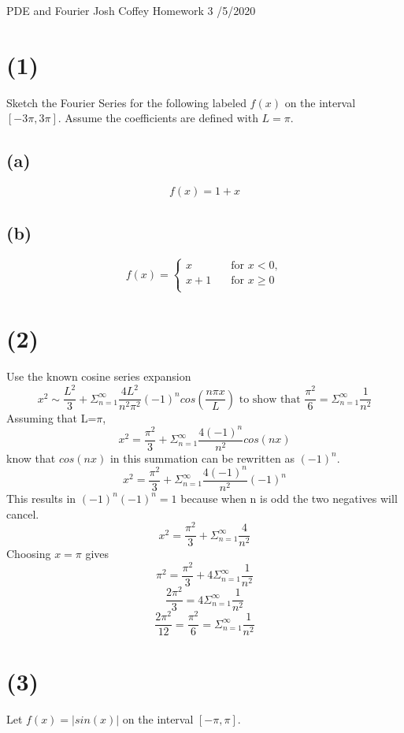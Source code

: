 \documentclass[preview,12pt]{article}
\begin{document}
\noindent PDE and Fourier\newline
Josh Coffey \newline
Homework 3 /5/2020 \newline

\section*{(1)}
    Sketch the Fourier Series for the following labeled $f(x)$ on the interval $[-3\pi,3\pi]$.  Assume the coefficients are defined with $L=\pi$.
    \subsection*{(a)}
        $$f(x)=1+x$$
    \vspace{2in}
    \subsection*{(b)}
        \[   
        f(x) = 
        \begin{cases}
         x &\quad\text{for } x<0, \\
         x+1 &\quad\text{for } x\geq0 \\
        \end{cases}
        \]
    \vspace{2in}
\section*{(2)}
    Use the known cosine series expansion
    $$x^2\sim\frac{L^2}{3}+\Sigma_{n=1}^\infty \frac{4L^2}{n^2\pi^2}(-1)^ncos(\frac{n\pi x}{L}) \textrm{ to show that } \frac{\pi^2}{6}=\Sigma_{n=1}^\infty \frac{1}{n^2}$$
    Assuming that L=$\pi$,
    $$x^2=\frac{\pi^2}{3}+\Sigma_{n=1}^\infty\frac{4(-1)^n}{n^2}cos(nx)$$
    know that $cos(nx)$ in this summation can be rewritten as $(-1)^n$.
    $$x^2=\frac{\pi^2}{3}+\Sigma_{n=1}^\infty\frac{4(-1)^n}{n^2}(-1)^n$$
    This results in $(-1)^n(-1)^n=1$ because when n is odd the two negatives will cancel.
    $$x^2=\frac{\pi^2}{3}+\Sigma_{n=1}^\infty\frac{4}{n^2}$$
    Choosing $x=\pi$ gives
    $$\pi^2=\frac{\pi^2}{3}+4\Sigma_{n=1}^\infty\frac{1}{n^2}$$
    $$\frac{2\pi^2}{3}=4\Sigma_{n=1}^\infty\frac{1}{n^2}$$
    $$\frac{2\pi^2}{12}=\frac{\pi^2}{6}=\Sigma_{n=1}^\infty\frac{1}{n^2}$$
    
\section*{(3)}
    Let $f(x)=|{sin(x)}|$ on the interval $[-\pi,\pi]$.  
\end{document}
